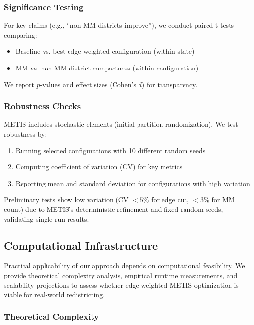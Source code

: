 \subsubsection{Significance Testing}

For key claims (e.g., ``non-MM districts improve''), we conduct paired t-tests comparing:
\begin{itemize}
    \item Baseline vs. best edge-weighted configuration (within-state)
    \item MM vs. non-MM district compactness (within-configuration)
\end{itemize}

We report $p$-values and effect sizes (Cohen's $d$) for transparency.

\subsubsection{Robustness Checks}

METIS includes stochastic elements (initial partition randomization). We test robustness by:
\begin{enumerate}
    \item Running selected configurations with 10 different random seeds
    \item Computing coefficient of variation (CV) for key metrics
    \item Reporting mean and standard deviation for configurations with high variation
\end{enumerate}

Preliminary tests show low variation (CV $< 5\%$ for edge cut, $< 3\%$ for MM count) due to METIS's deterministic refinement and fixed random seeds, validating single-run results.

\subsection{Computational Infrastructure}

Practical applicability of our approach depends on computational feasibility. We provide theoretical complexity analysis, empirical runtime measurements, and scalability projections to assess whether edge-weighted METIS optimization is viable for real-world redistricting.

\subsubsection{Theoretical Complexity}

